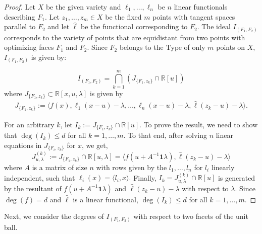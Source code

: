 \documentclass{article}
\numberwithin{theorem}{section}
\theoremstyle{definition}
\theoremstyle{example_contd}
\newcommand{\RR}{\mathbb{R}}
\newcommand{\type}{\mathrm{Type}}
\newcommand{\IF}{I_{(F_1,F_2)}}
\renewcommand{\l}{\lambda}
\begin{document}
\begin{proof}
Let $X$ be the given variety and $\ell_1, \dots , \ell_n$ be $n$ linear functionals describing $F_1$. Let $z_1,\ldots,z_m\in X$ be the fixed $m$ points with tangent spaces parallel to $F_2$ and let $\hat{\ell}$ be the functional corresponding to $F_2$. The ideal $\IF$ corresponds to the variety of points that are equidistant from two points with optimizing faces $F_1$ and $F_2$. Since $F_2$ belongs to the $\type$ of only $m$ points on $X$, $\IF$ is given by: 

\begin{equation}
    \IF=\bigcap_{k=1}^m (J_{\{F_1,z_k\}}\cap \RR[u])
\end{equation}
where $J_{\{F_1,z_k\}}\subset \RR[x,u,\l]$ is given by
\begin{align*}
	J_{\{F_1,z_k\}}:= \langle f(x),\ell_1(x-u)-\lambda, \ldots, \ell_n(x-u) - \lambda, \hat{\ell}(z_k-u)-\lambda \rangle.
\end{align*}

For an arbitrary $k$, let $I_k:=J_{\{F_1,z_k\}}\cap \RR[u]$. To prove the result, we need to show that $\deg(I_k)\leq d$ for all $k=1,\ldots, m.$ To that end, after solving $n$ linear equations in $J_{\{F_i,z_k\}}$ for $x$, we get,
\[J_{u,\l}^{(k)}:=J_{\{F_1,z_k\}}\cap \RR[u,\l]=\langle f(u+A^{-1}\mathbf{1}\lambda), \hat{\ell}(z_k-u)-\lambda \rangle\]
where $A$ is a matrix of size $n$ with rows given by the $l_1,\ldots,l_n$ for $l_i$ linearly independent, such that $\ell_i(x)=\langle l_i,x \rangle.$ 
Finally, $I_k=J_{u,\l}^{(k)}\cap \RR[u]$ is generated by the resultant of $f(u+A^{-1}\mathbf{1}\lambda)$ and $ \hat{\ell}(z_k-u)-\lambda$ with respect to $\l$. Since $\deg(f)=d$ and $\hat{\ell}$ is a linear functional, $\deg(I_k)\leq d$ for all $k=1,\ldots,m.$
\end{proof}


Next, we consider the degrees of $\IF$ with respect to two facets of the unit ball. 
\end{document}

